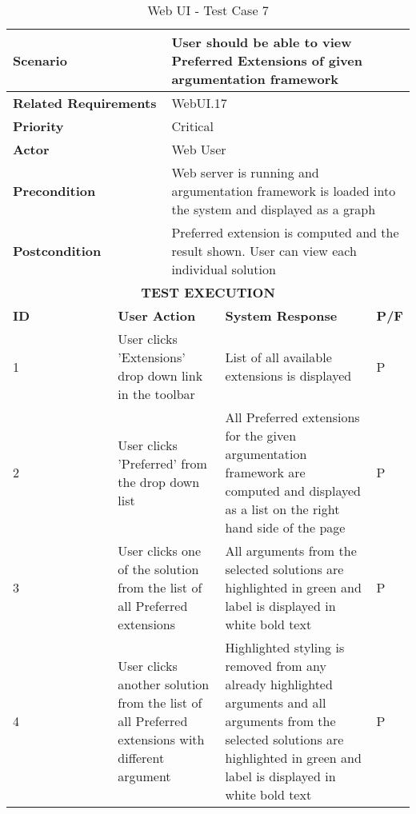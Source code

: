 \begin{longtable}[c]{p{}|p{}|p{}|p{}|p{}}
	\caption{Web UI - Test Case 7}
	\label{table:testcase7} \\
	\hline
	\multicolumn{2}{p{0.3\textwidth}}{\textbf{Scenario}} & \multicolumn{3}{p{0.6\textwidth}}{User should be able to view Preferred Extensions of given argumentation framework} \\ 
	\hline
	\endfirsthead
	\endhead
	\multicolumn{2}{p{0.3\textwidth}}{\textbf{Related Requirements}} & \multicolumn{3}{p{0.6\textwidth}}{WebUI.17} \\ 
	\hline
	\multicolumn{2}{p{0.3\textwidth}}{\textbf{Priority}} & \multicolumn{3}{p{0.6\textwidth}}{Critical} \\ 
	\hline
	\multicolumn{2}{p{0.3\textwidth}}{\textbf{Actor}} & \multicolumn{3}{p{0.6\textwidth}}{Web User} \\ 
	\hline
	\multicolumn{2}{p{0.3\textwidth}}{\textbf{Precondition}} & \multicolumn{3}{p{0.6\textwidth}}{Web server is running and argumentation framework is loaded into the system and displayed as a graph} \\ 
	\hline
	\multicolumn{2}{p{0.3\textwidth}}{\textbf{Postcondition}} & \multicolumn{3}{p{0.6\textwidth}}{Preferred extension is computed and the result shown. User can view each individual solution} \\ 
	\hline
	\multicolumn{5}{c}{\cellcolor{grey}\textbf{TEST EXECUTION}} \\ 
	\hline
	\textbf{ID} & \multicolumn{2}{|p{0.4\textwidth}|}{\textbf{User Action}} & \textbf{System Response} & \textbf{P/F} \\ 
	\hline
	1 & \multicolumn{2}{|p{0.4\textwidth}|}{User clicks 'Extensions' drop down link in the toolbar} & List of all available extensions is displayed & P \\ 
	\hline
	2 & \multicolumn{2}{|p{0.4\textwidth}|}{User clicks 'Preferred' from the drop down list} & All Preferred extensions for the given argumentation framework are computed and displayed as a list on the right hand side of the page & P \\ 
	\hline
	3 & \multicolumn{2}{|p{0.4\textwidth}|}{User clicks one of the solution from the list of all Preferred extensions} & All arguments from the selected solutions are highlighted in green and label is displayed in white bold text & P \\ 
	\hline
	4 & \multicolumn{2}{|p{0.4\textwidth}|}{User clicks another solution from the list of all Preferred extensions with different argument} & Highlighted styling is removed from any already highlighted arguments and all arguments from the selected solutions are highlighted in green and label is displayed in white bold text & P \\ 
	\hline
\end{longtable}

